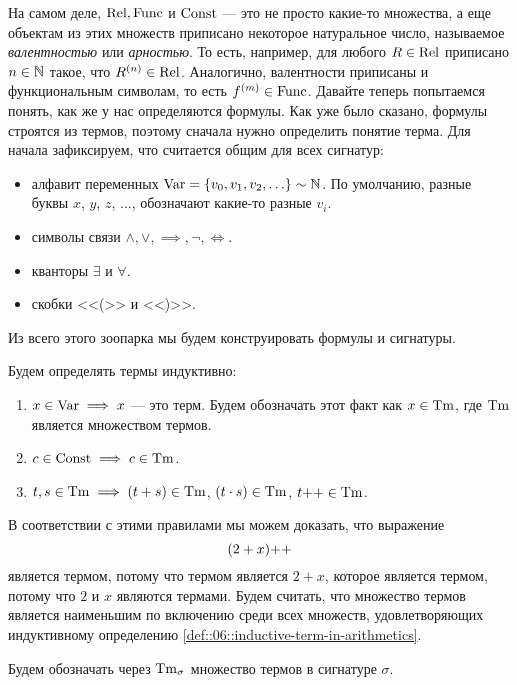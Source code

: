 На самом деле, $\mathrm{Rel}, \mathrm{Func}$ и $\mathrm{Const}$ --- это не просто какие-то множества, а еще объектам из этих множеств приписано некоторое натуральное число, называемое {\it валентностью} или {\it арностью}.
То есть, например, для любого $R \in \mathrm{Rel}$ приписано $n \in \mathbb{N}$ такое, что $R^{(n)} \in \mathrm{Rel}$.
Аналогично, валентности приписаны и функциональным символам, то есть $f^{(m)} \in \mathrm{Func}$.
Давайте теперь попытаемся понять, как же у нас определяются формулы.
Как уже было сказано, формулы строятся из термов, поэтому сначала нужно определить понятие терма.
Для начала зафиксируем, что считается общим для всех сигнатур:
\begin{itemize}
    \item алфавит переменных $\mathrm{Var} = \left\{v_{0}, v_{1}, v_{2}, \ldots\right\} \sim \mathbb{N}$.
    По умолчанию, разные буквы $x$, $y$, $z$, $\dots$, обозначают какие-то разные $v_{i}$.
    \item символы связи $\land, \lor, \implies, \neg, \iff$.
    \item кванторы $\exists$ и $\forall$.
    \item скобки <<(>> и <<)>>. 
\end{itemize}
Из всего этого зоопарка мы будем конструировать формулы и сигнатуры.

\begin{definition} \label{def::06::inductive-term-in-arithmetics}
    Будем определять термы индуктивно:
    \begin{enumerate}
        \item $x \in \mathrm{Var} \implies x$ --- это терм.
        Будем обозначать этот факт как $x \in \mathrm{Tm}$, где $\mathrm{Tm}$ является множеством термов.
        \item $c \in \mathrm{Const} \implies c \in \mathrm{Tm}$.
        \item $t, s \in \mathrm{Tm} \implies (t + s) \in \mathrm{Tm}$, $(t \cdot s) \in \mathrm{Tm}$, $t{++} \in \mathrm{Tm}$.
    \end{enumerate}
\end{definition}

В соответствии с этими правилами мы можем доказать, что выражение
$$
    (2 + x){++}
$$
является термом, потому что термом является $2 + x$, которое является термом, потому что $2$ и $x$ являются термами.
Будем считать, что множество термов является наименьшим по включению среди всех множеств, удовлетворяющих индуктивному определению \ref{def::06::inductive-term-in-arithmetics}.

\begin{definition}
    Будем обозначать через $\mathrm{Tm}_{\sigma}$ множество термов в сигнатуре $\sigma$.
\end{definition}

